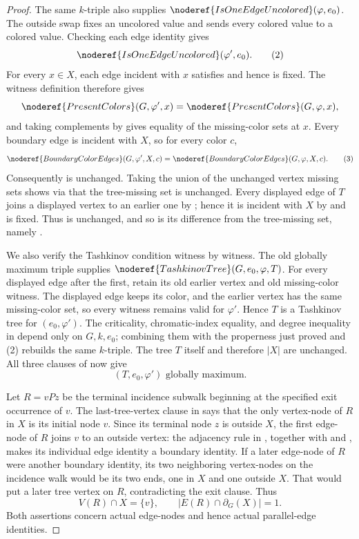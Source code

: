\begin{proof}
The same $k$-triple also supplies
$\noderef{IsOneEdgeUncolored}(\varphi,e_0)$.  The outside swap fixes an
uncolored value and sends every colored value to a colored value.
Checking each edge identity gives
\[
 \noderef{IsOneEdgeUncolored}(\varphi',e_0).                    \tag{2}
\]
For every $x\in X$, each edge incident with $x$ satisfies
 and hence is fixed.  The witness definition
 therefore gives
\[
 \noderef{PresentColors}(G,\varphi',x)
   =\noderef{PresentColors}(G,\varphi,x),
\]
and taking complements by  gives equality of the
missing-color sets at $x$.  Every boundary edge is incident with $X$, so
for every color $c$,
\[
 \noderef{BoundaryColorEdges}(G,\varphi',X,c)
   =\noderef{BoundaryColorEdges}(G,\varphi,X,c).                \tag{3}
\]
Consequently  is unchanged.  Taking the union
of the unchanged vertex missing sets shows via
 that the tree-missing set is unchanged.
Every displayed edge of $T$ joins a displayed vertex to an earlier one by
; hence it is incident with $X$ by
 and is fixed.  Thus
 is unchanged, and so is its difference from the
tree-missing set, namely .

We also verify the Tashkinov condition witness by witness.  The old
globally maximum triple supplies
$\noderef{TashkinovTree}(G,e_0,\varphi,T)$.  For every displayed edge
after the first, retain its old earlier vertex and old missing-color
witness.  The displayed edge keeps its color, and the earlier vertex has
the same missing-color set, so every witness remains valid for
$\varphi'$.  Hence $T$ is a Tashkinov tree for $(e_0,\varphi')$.  The
criticality, chromatic-index equality, and degree inequality in
 depend only on $G,k,e_0$; combining them with the
properness just proved and (2) rebuilds the same $k$-triple.  The tree
$T$ itself and therefore $|X|$ are unchanged.  All three clauses of
 now give
\[
 (T,e_0,\varphi')\text{ globally maximum}.                     \tag{4}
\]

Let $R=vPz$ be the terminal incidence subwalk beginning at the specified
exit occurrence of $v$.  The last-tree-vertex clause in
 says that the only vertex-node of $R$ in $X$
is its initial node $v$.  Since its terminal node $z$ is outside $X$, the
first edge-node of $R$ joins $v$ to an outside vertex: the adjacency rule
in , together with
 and , makes its individual
edge identity a boundary identity.  If a later edge-node of $R$ were
another boundary identity, its two neighboring vertex-nodes on the
incidence walk would be its two ends, one in $X$ and one outside $X$.
That would put a later tree vertex on $R$, contradicting the exit clause.
Thus
\[
 V(R)\cap X=\{v\},\qquad
 \bigl|E(R)\cap\partial_G(X)\bigr|=1.                           \tag{5}
\]
Both assertions concern actual edge-nodes and hence actual parallel-edge
identities.


\end{proof}
